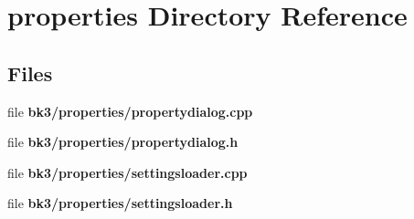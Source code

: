\section{properties Directory Reference}
\label{dir_75d595c0ce0c6ca4edb658d8ecd769c1}
\subsection*{Files}
\begin{DoxyCompactItemize}
\item 
file {\bf bk3/properties/propertydialog.\+cpp}
\item 
file {\bf bk3/properties/propertydialog.\+h}
\item 
file {\bf bk3/properties/settingsloader.\+cpp}
\item 
file {\bf bk3/properties/settingsloader.\+h}
\end{DoxyCompactItemize}
